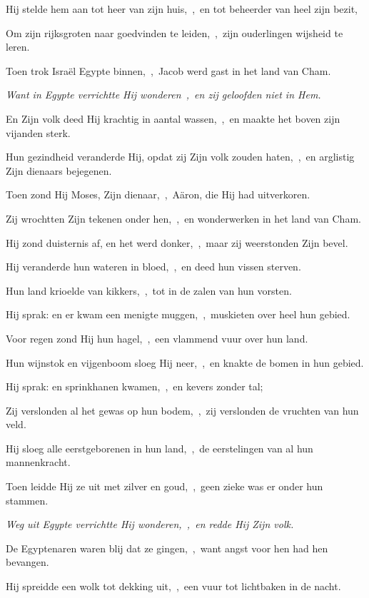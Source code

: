 \documentclass[12pt,twoside,a5paper]{article}
\begin{document}
\begin{halfparskip}
  Hij stelde hem aan tot heer van zijn huis,~\sep\ en tot beheerder van heel zijn bezit,

  Om zijn rijksgroten naar goedvinden te leiden,~\sep\ zijn ouderlingen wijsheid te leren.

  Toen trok Israël Egypte binnen,~\sep\ Jacob werd gast in het land van Cham.

  \emph{Want in Egypte verrichtte Hij wonderen~\sep\ en zij geloofden niet in Hem.}

  En Zijn volk deed Hij krachtig in aantal wassen,~\sep\ en maakte het boven zijn vijanden sterk.

  Hun gezindheid veranderde Hij, opdat zij Zijn volk zouden haten,~\sep\ en arglistig Zijn dienaars bejegenen.

  Toen zond Hij Moses, Zijn dienaar,~\sep\ Aäron, die Hij had uitverkoren.

  Zij wrochtten Zijn tekenen onder hen,~\sep\ en wonderwerken in het land van Cham.

  Hij zond duisternis af, en het werd donker,~\sep\ maar zij weerstonden Zijn bevel.

  Hij veranderde hun wateren in bloed,~\sep\ en deed hun vissen sterven.

  Hun land krioelde van kikkers,~\sep\ tot in de zalen van hun vorsten.

  Hij sprak: en er kwam een menigte muggen,~\sep\ muskieten over heel hun gebied.

  Voor regen zond Hij hun hagel,~\sep\ een vlammend vuur over hun land.

  Hun wijnstok en vijgenboom sloeg Hij neer,~\sep\ en knakte de bomen in hun gebied.

  Hij sprak: en sprinkhanen kwamen,~\sep\ en kevers zonder tal;

  Zij verslonden al het gewas op hun bodem,~\sep\ zij verslonden de vruchten van hun veld.

  Hij sloeg alle eerstgeborenen in hun land,~\sep\ de eerstelingen van al hun mannenkracht.

  Toen leidde Hij ze uit met zilver en goud,~\sep\ geen zieke was er onder hun stammen.

  \emph{Weg uit Egypte verrichtte Hij wonderen,~\sep\ en redde Hij Zijn volk.}

  De Egyptenaren waren blij dat ze gingen,~\sep\ want angst voor hen had hen bevangen.

  Hij spreidde een wolk tot dekking uit,~\sep\ een vuur tot lichtbaken in de nacht.


\end{halfparskip}
\end{document}
